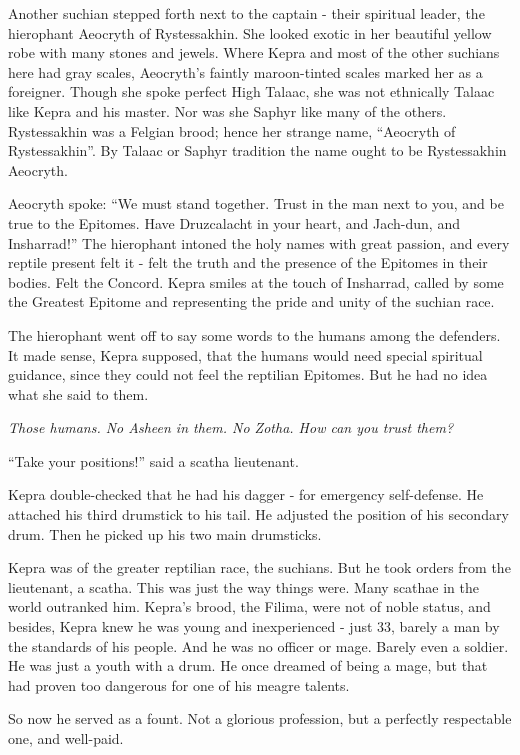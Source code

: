 \documentclass
  [a4paper,
   12pt,
   oneside
  ]%
  {article}
\begin{document}
Another suchian stepped forth next to the captain - their spiritual leader, the hierophant Aeocryth of Rystessakhin.
She looked exotic in her beautiful yellow robe with many stones and jewels. 
Where Kepra and most of the other suchians here had gray scales, Aeocryth’s faintly maroon-tinted scales marked her as a foreigner. 
Though she spoke perfect High Talaac, she was not ethnically Talaac like Kepra and his master. Nor was she Saphyr like many of the others. Rystessakhin was a Felgian brood; hence her strange name, ``Aeocryth of Rystessakhin''. By Talaac or Saphyr tradition the name ought to be Rystessakhin Aeocryth. 

Aeocryth spoke: ``We must stand together. Trust in the man next to you, and be true to the Epitomes. Have Druzcalacht in your heart, and Jach-dun, and Insharrad!'' 
The hierophant intoned the holy names with great passion, and every reptile present felt it - felt the truth and the presence of the Epitomes in their bodies. Felt the Concord. 
Kepra smiles at the touch of Insharrad, called by some the Greatest Epitome and representing the pride and unity of the suchian race.

The hierophant went off to say some words to the humans among the defenders. 
It made sense, Kepra supposed, that the humans would need special spiritual guidance, since they could not feel the reptilian Epitomes. But he had no idea what she said to them.

\emph{Those humans. No Asheen in them. No Zotha. How can you trust them?}

``Take your positions!'' said a scatha lieutenant. 

Kepra double-checked that he had his dagger - for emergency self-defense. 
He attached his third drumstick to his tail. 
He adjusted the position of his secondary drum. 
Then he picked up his two main drumsticks.

Kepra was of the greater reptilian race, the suchians. But he took orders from the lieutenant, a scatha. 
This was just the way things were. 
Many scathae in the world outranked him.
Kepra’s brood, the Filima, were not of noble status, and besides, Kepra knew he was young and inexperienced - just 33, barely a man by the standards of his people. 
And he was no officer or mage. 
Barely even a soldier. 
He was just a youth with a drum. 
He once dreamed of being a mage, but that had proven too dangerous for one of his meagre talents. 

So now he served as a fount. Not a glorious profession, but a perfectly respectable one, and well-paid.
\end{document}

